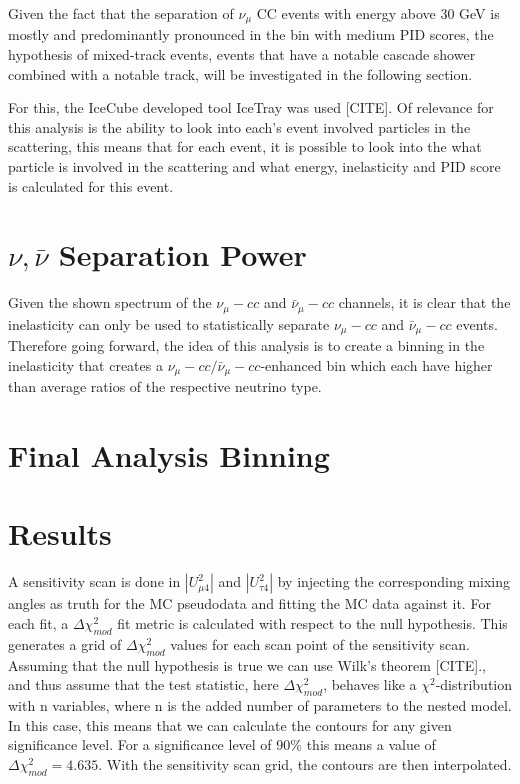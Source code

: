 \documentclass[a4paper,12pt,numbered]{article}
\begin{document}
Given the fact that the separation of $\nu_\mu$ CC events with energy above 30 GeV is mostly and predominantly pronounced in the bin with medium PID scores, the hypothesis of mixed-track events, events that have a notable cascade shower combined with a notable track, will be investigated in the following section. 

For this, the IceCube developed tool IceTray was used [CITE]. Of relevance for this analysis is the ability to look into each's event involved particles in the scattering, this means that for each event, it is possible to look into the what particle is involved in the scattering and what energy, inelasticity and PID score is calculated for this event.

\section{$\nu, \bar{\nu}$ Separation Power}
Given the shown spectrum of the $\nu_\mu-cc$ and $\bar{\nu}_\mu-cc$ channels, it is clear that the inelasticity can only be used to statistically separate $\nu_\mu-cc$ and $\bar{\nu}_\mu-cc$ events. Therefore going forward, the idea of this analysis is to create a binning in the inelasticity that creates a $\nu_\mu-cc/\bar{\nu}_\mu-cc$-enhanced bin which each have higher than average ratios of the respective neutrino type.
\section{Final Analysis Binning}
\section{Results}

A sensitivity scan is done in $|U_{\mu 4}^2|$ and $|U_{\tau 4}^2|$ by injecting the corresponding mixing angles as truth for the MC pseudodata and fitting the MC data against it. For each fit, a $\Delta \chi_{mod}^2$ fit metric is calculated with respect to the null hypothesis. This generates a grid of $\Delta \chi_{mod}^2$ values for each scan point of the sensitivity scan. Assuming that the null hypothesis is true we can use Wilk's theorem [CITE]., and thus assume that the test statistic, here $\Delta \chi_{mod}^2$, behaves like a $\chi^2$-distribution with n variables, where n is the added number of parameters to the nested model. In this case, this means that we can calculate the contours for any given significance level. For a significance level of 90$\%$ this means a value of $\Delta \chi_{mod}^2=4.635$. With the sensitivity scan grid, the contours are then interpolated.
\end{document}
